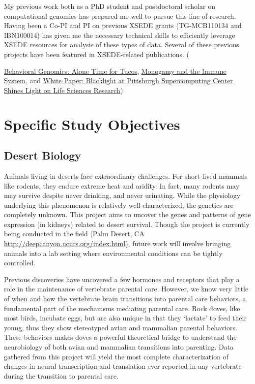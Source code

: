 \documentclass[10.5pt]{article}
\begin{document}
\noindent
My previous work both as a PhD student and postdoctoral scholar on computational genomics has prepared me well to pursue this line of research. Having been a Co-PI and PI on previous XSEDE grants (TG-MCB110134 and IBN100014) has given me the necessary technical skills to efficiently leverage XSEDE resources for analysis of these types of data. Several of these previous projects have been featured in XSEDE-related publications. ({\href{http://goo.gl/3lXKf}{Behavioral Genomics: Alone Time for Tucos}, \href{http://goo.gl/fasl6}{Monogamy and the Immune System}, and \href{http://goo.gl/iGKSN}{White Paper: Blacklight at Pittsburgh Supercomputing Center Shines Light on Life Sciences Research})

\section*{Specific Study Objectives}

\subsection*{Desert Biology}
Animals living in deserts face extraordinary challenges. For short-lived mammals like rodents, they endure extreme heat and aridity. In fact, many rodents may may survive despite never drinking, and never urinating. While the physiology underlying this phenomenon is relatively well characterized, the genetics are completely unknown. This project aims to uncover the genes and patterns of gene expression (in kidneys) related to desert survival. Though the project is currently being conducted in the field (Palm Desert, CA \url{http://deepcanyon.ucnrs.org/index.html}), future work will involve bringing animals into a lab setting where environmental conditions can be tightly controlled. 

Previous discoveries have uncovered a few hormones and receptors that play a role in the maintenance of vertebrate parental care. However, we know very little of when and how the vertebrate brain transitions into parental care behaviors, a fundamental part of the mechanisms mediating parental care. Rock doves, like most birds, incubate eggs, but are also unique in that they ‘lactate’ to feed their young, thus they show stereotyped avian and mammalian parental behaviors. These behaviors makes doves a powerful theoretical bridge to understand the neurobiology of both avian and mammalian transitions into parenting. Data gathered from this project will yield the most complete characterization of changes in neural transcription and translation ever reported in any vertebrate during the transition to parental care. \\

}
\end{document}
